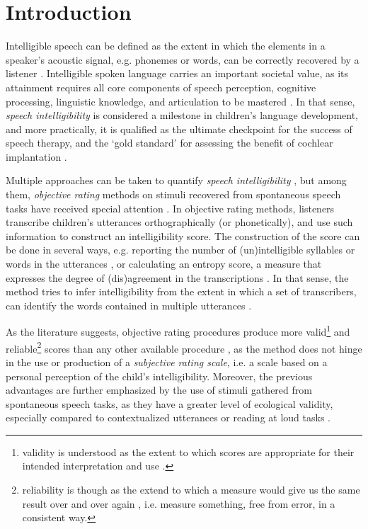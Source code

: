 \section{Introduction} \label{S:introduction}

Intelligible speech can be defined as the extent in which the elements in a speaker's acoustic signal, e.g. phonemes or words, can be correctly recovered by a listener \cite{Freeman_et_al_2017, Kent_et_al_1989, vanHeuven_2008, Whitehill_et_al_2004}. Intelligible spoken language carries an important societal value, as its attainment requires all core components of speech perception, cognitive processing, linguistic knowledge, and articulation to be mastered \cite{Freeman_et_al_2017}. In that sense, \textit{speech intelligibility} is considered a milestone in children's language development, and more practically, it is qualified as the ultimate checkpoint for the success of speech therapy, and the `gold standard' for assessing the benefit of cochlear implantation \cite{Chin_et_al_2012}. 

Multiple approaches can be taken to quantify \textit{speech intelligibility} \cite{Boonen_et_al_2020, Boonen_et_al_2021, Flipsen_2006, Hustad_et_al_2020}, but among them, \textit{objective rating} methods on stimuli recovered from spontaneous speech tasks have received special attention \cite{Boonen_et_al_2021, Hustad_et_al_2020}. In objective rating methods, listeners transcribe children's utterances orthographically (or phonetically), and use such information to construct an intelligibility score. The construction of the score can be done in several ways, e.g. reporting the number of (un)intelligible syllables or words in the utterances \cite{Flipsen_2006, Lagerberg_et_al_2014}, or calculating an entropy score, a measure that expresses the degree of (dis)agreement in the transcriptions \cite{Boonen_et_al_2021, Shannon_1948}. In that sense, the method tries to infer intelligibility from the extent in which a set of transcribers, can identify the words contained in multiple utterances \cite{Boonen_et_al_2021}. 

As the literature suggests, objective rating procedures produce more valid\footnote{validity is understood as the extent to which scores are appropriate for their intended interpretation and use \cite{Lesterhuis_2018, Trochim_2022}.} and reliable\footnote{reliability is though as the extend to which a measure would give us the same result over and over again \cite{Trochim_2022}, i.e. measure something, free from error, in a consistent way.} scores than any other available procedure \cite{Boonen_et_al_2021, Faes_et_al_2021}, as the method does not hinge in the use or production of a \textit{subjective rating scale}, i.e. a scale based on a personal perception of the child's intelligibility. Moreover, the previous advantages are further emphasized by the use of stimuli gathered from spontaneous speech tasks, as they have a greater level of ecological validity, especially compared to contextualized utterances or reading at loud tasks \cite{Flipsen_2006, Ertmer_2011}.

